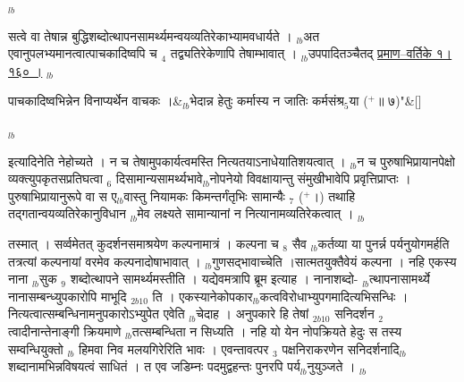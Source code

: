 \documentclass[article,12pt,a4paper]{memoir}%
\newcommand{\add}[1]{($^{+}$#1)}
\newcounter{parCount}
\begin{document}
	  \endgroup
	{\tiny $_{lb}$}

	  
	  \pstart \leavevmode%
	सत्वे वा तेषान्न बुद्धिशब्दोत्थापनसामर्थ्यमन्वयव्यतिरेकाभ्यामवधार्यते । {\tiny $_{lb}$}अत एवानुपलभ्यमानत्वात्पाचकादिष्वपि च {\tiny $_{4}$} तद्व्यतिरेकेणापि तेषाम्भावात् । {\tiny $_{lb}$}उपपादितञ्चैतद् \href{http://sarit.indology.info/?cref=pv.1.160}{प्रमाण–वर्तिके १।१६० ।}
	{}
	\pend%
      {\tiny $_{lb}$}
	  \bigskip
	  \begingroup
	
	    
	    \stanza[\smallbreak]
	  पाचकादिष्वभिन्नेन विनाप्यर्थेन वाचकः ।&{\tiny $_{lb}$}भेदान्न हेतुः कर्मास्य न जातिः कर्मसंश्र{\tiny $_{5}$}या \add{॥ ७}{\normalfontlatin\large\qquad{}"}\&[\smallbreak]
	  
	  
	  
	  \endgroup
	{\tiny $_{lb}$}

	  
	  \pstart \leavevmode%
	इत्यादिनेति नेहोच्यते । न च तेषामुपकार्यत्वमस्ति नित्यतयाऽनाधेयातिशयत्वात् । {\tiny $_{lb}$}न च पुरुषाभिप्रायानपेक्षो व्यक्त्युपकृतसप्रतिघत्वा {\tiny $_{6}$} दिसामान्यसामर्थ्यभावे{\tiny $_{lb}$}नोपनेयो विवक्षायान्तु संमुखीभावेपि प्रवृत्तिप्राप्तः । पुरुषाभिप्रायानुरूपे वा स ए{\tiny $_{lb}$}वास्तु नियामकः किमन्तर्गंतृभिः सामान्यैः {\tiny $_{7}$} \add{।} तथाहि तद्गतान्वयव्यतिरेकानुविधान {\tiny $_{lb}$}मेव लक्ष्यते सामान्यानां न नित्यानामव्यतिरेकत्वात् ।
	{}
	\pend%
      {\tiny $_{lb}$}

	  
	  \pstart \leavevmode%
	तस्मात् । सर्व्वमेतत् कुदर्शनसमाश्रयेण कल्पनामात्रं । कल्पना च {\tiny $_{8}$} सैव {\tiny $_{lb}$}कर्तव्या या पुनर्न्न पर्यनुयोगमर्हति तत्रत्यां कल्पनायां वरमेव कल्पनादोषाभावात् । {\tiny $_{lb}$}गुणसद्भावाच्चेति ।सात्मतयुक्तैवेयं कल्पना । नहि एकस्य नाना {\tiny $_{lb}$}सुक {\tiny $_{9}$} \leavevmode{} शब्दोत्थापने सामर्थ्यमस्तीति । यद्येवमत्रापि ब्रूम इत्याह । नानाशब्दो- {\tiny $_{lb}$}त्थापनासामर्थ्ये {\color{DodgerBlue3}नानासम्बन्ध्युपकारोपि माभूदि} {\tiny $_{2b10}$} ति । एकस्यानेकोपकार{\tiny $_{lb}$}कत्वविरोधाभ्युपगमादित्यभिसन्धिः । नित्यत्वात्सम्बन्धिनामनुपकारोऽभ्युपेत एवेति {\tiny $_{lb}$}चेदाह । {\color{DodgerBlue3}अनुपकारे हि तेषां} {\tiny $_{2b10}$} सनिदर्शन {\tiny $_{2}$} त्वादीनान्तेनाङ्गी {\color{DodgerBlue3}क्रियमाणे {\tiny $_{lb}$}तत्सम्बन्धिता न सिध्यति} । नहि यो येन नोपक्रियते हेदुः स तस्य सम्वन्धियुक्तो {\tiny $_{lb}$} \leavevmode{} {\color{DodgerBlue3}हिमवा} निव {\color{DodgerBlue3}मलयगिरेरिति} भावः । एवन्तावत्पर {\tiny $_{3}$} पक्षनिराकरणेन सनिदर्शनादि{\tiny $_{lb}$}शब्दानामभिन्नविषयत्वं साधितं । त एव जडिम्नः पदमुद्वहन्तः पुनरपि पर्य{\tiny $_{lb}$}नुयुञ्जते ।
	{}
	\pend%
      {\tiny $_{lb}$}
\end{document}
